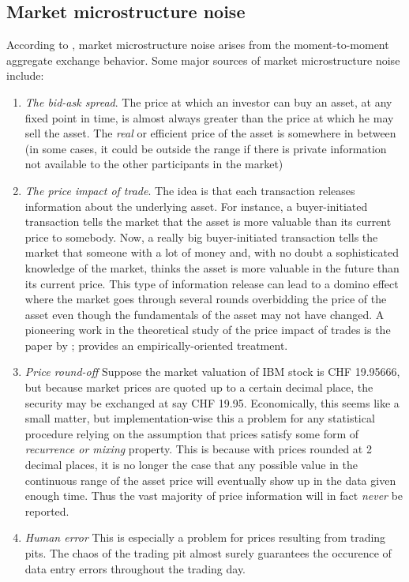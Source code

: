\subsection{Market microstructure noise}  
According to \cite{Garman1976}, market microstructure noise arises from the moment-to-moment aggregate exchange behavior. Some major sources of market microstructure noise include:
    \begin{enumerate}
      \item \emph{The bid-ask spread}. The price at which an investor can buy an asset, at any fixed point in time,   is almost always greater than the price at which he may sell the asset. The \emph{real} or efficient price of the asset is somewhere in between (in some cases, it could be outside the range if there is private information not available to the other participants in the market)
      \item \emph{The price impact of trade}. The idea is that each transaction releases information about the underlying asset. For instance, a buyer-initiated transaction tells the market that the asset is more valuable than its current price to somebody. Now, a really big buyer-initiated transaction tells the market that someone with a lot of money and, with no doubt a sophisticated knowledge of the market, thinks the asset is more valuable in the future than its current price. This type of information release can lead to a domino effect where the market goes through several rounds overbidding the price of the asset even though the fundamentals of the asset may not have changed. A pioneering work in the theoretical study of the price impact of trades is the paper by \cite{Roll1984};  \cite{Hasbrouck1991} provides an empirically-oriented treatment.
      \item \emph{Price round-off} Suppose the market valuation of IBM stock is CHF 19.95666, but because market prices are quoted up to a certain decimal place, the security may be exchanged  at say CHF 19.95. Economically, this seems like a small matter, but implementation-wise  this  a problem for any statistical procedure relying on the assumption that prices satisfy some form of \emph{recurrence or mixing} property. This is because with prices rounded at 2 decimal places, it is no longer the case that any possible value in the continuous range of the asset price will eventually show up in the data given enough time. Thus the vast majority of price information  will in fact \emph{never} be reported.
      \item\emph{Human error} This is especially a problem for prices resulting from trading pits. The chaos of the trading pit almost surely guarantees the occurence of data entry errors throughout the trading day.
\end{enumerate}
